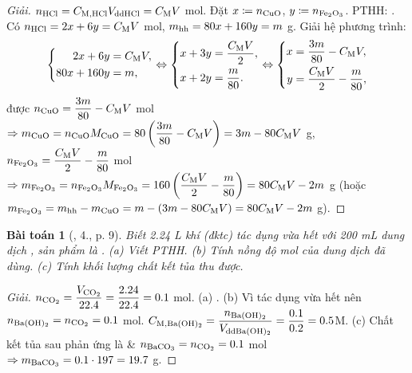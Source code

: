 \documentclass{article}
\newtheorem{baitoan}{Bài toán}
\begin{document}
\begin{proof}[Giải]
	$n_{\rm HCl} = C_{\rm M,HCl}V_{\rm ddHCl} = C_{\rm M}V$ mol. Đặt $x\coloneqq n_{\rm CuO}$, $y\coloneqq n_{\ce{Fe2O3}}$. PTHH: . Có $n_{\rm HCl} = 2x + 6y = C_{\rm M}V$ mol, $m_{\rm hh} = 80x + 160y = m$ g. Giải hệ phương trình:
	\begin{equation*}
		\left\{\begin{split}
			2x + 6y &= C_{\rm M}V,\\
			80x + 160y &= m,
		\end{split}\right.\Leftrightarrow\left\{\begin{split}
			x + 3y &= \frac{C_{\rm M}V}{2},\\
			x + 2y &= \frac{m}{80}.
		\end{split}\right.\Leftrightarrow\left\{\begin{split}
			x &= \frac{3m}{80} - C_{\rm M}V,\\
			y &= \frac{C_{\rm M}V}{2} - \frac{m}{80},
		\end{split}\right.
	\end{equation*}
	được $n_{\rm CuO} = \dfrac{3m}{80} - C_{\rm M}V$ mol $\Rightarrow m_{\rm CuO} = n_{\rm CuO}M_{\rm CuO} = 80\left(\dfrac{3m}{80} - C_{\rm M}V\right) = 3m - 80C_{\rm M}V$ g, $n_{\ce{Fe2O3}} = \dfrac{C_{\rm M}V}{2} - \dfrac{m}{80}$ mol $\Rightarrow m_{\ce{Fe2O3}} = n_{\ce{Fe2O3}}M_{\ce{Fe2O3}} = 160\left(\dfrac{C_{\rm M}V}{2} - \dfrac{m}{80}\right) = 80C_{\rm M}V - 2m$ g (hoặc $m_{\ce{Fe2O3}} = m_{\rm hh} - m_{\rm CuO} = m - (3m - 80C_{\rm M}V) = 80C_{\rm M}V - 2m$ g).
\end{proof}

\begin{baitoan}[\cite{SGK_Hoa_Hoc_9}, 4., p. 9]
	Biết {\rm2.24 L} khí {\rm{}} (đktc) tác dụng vừa hết với {\rm200 mL} dung dịch {\rm{}}, sản phẩm là {\rm{}}. (a) Viết PTHH. (b) Tính nồng độ mol của dung dịch {\rm{}} đã dùng. (c) Tính khối lượng chất kết tủa thu được.
\end{baitoan}

\begin{proof}[Giải]
	$n_{\ce{CO2}} = \dfrac{V_{\ce{CO2}}}{22.4} = \dfrac{2.24}{22.4} = 0.1$ mol. (a) . (b) Vì  tác dụng vừa hết nên $n_{\ce{Ba(OH)2}} = n_{\ce{CO2}} = 0.1$ mol. $C_{\rm M,\ce{Ba(OH)2}} = \dfrac{n_{\ce{Ba(OH)2}}}{V_{\rm dd\ce{Ba(OH)2}}} = \dfrac{0.1}{0.2} = 0.5$M. (c) Chất kết tủa sau phản ứng là  \& $n_{\ce{BaCO3}} = n_{\ce{CO2}} = 0.1$ mol $\Rightarrow m_{\ce{BaCO3}} = 0.1\cdot197 = 19.7$ g.
\end{proof}
\end{document}
